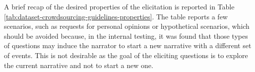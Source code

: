 A brief recap of the desired properties of the elicitation is reported in Table \ref{tab:dataset-crowdsourcing-guidelines-properties}.
The table reports a few scenarios, such as requests for personal opinions or hypothetical scenarios, which should be avoided because, in the internal testing, it was found that those types of questions may induce the narrator to start a new narrative with a different set of events. This is not desirable as the goal of the eliciting questions is to explore the current narrative and not to start a new one.
